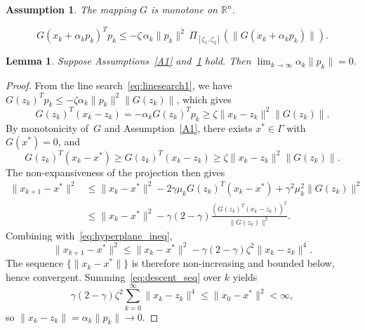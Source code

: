 \documentclass[10pt,a4paper]{amsart}
\newtheorem{assumption}{Assumption}
\newtheorem{lemma}{Lemma}
\newcommand{\PI}[1]{\Pi_{#1}}
\newcommand{\R}{\mathbb{R}}
\newcommand{\norm}[1]{\|#1\|}
\begin{document}
\begin{assumption}\label{A2}
The mapping $G$ is monotone on $\R^n$.
\end{assumption}

    \begin{equation}\label{eq:linesearch1}
      G(x_k + \alpha_k p_k)^T p_k \leq -\zeta\,\alpha_k\norm{p_k}^2\,\PI{[\zeta_1,\zeta_2]}(\norm{G(x_k + \alpha_k p_k)}).
    \end{equation}

\begin{lemma}\label{lem:limGMOP}
Suppose Assumptions~\ref{A1} and~\ref{A2} hold. Then $\lim_{k \to \infty} \alpha_k\norm{p_k} = 0$.
\end{lemma}

\begin{proof}
From the line search~\eqref{eq:linesearch1}, we have $G(z_k)^T p_k \leq -\zeta\alpha_k\norm{p_k}^2\norm{G(z_k)}$, which gives
\begin{equation}\label{eq:hyperplane_ineq}
  G(z_k)^T(x_k - z_k) = -\alpha_k G(z_k)^T p_k \geq \zeta\norm{x_k - z_k}^2\norm{G(z_k)}.
\end{equation}
By monotonicity of~$G$ and Assumption~\ref{A1}, there exists $x^* \in \Gamma$ with $G(x^*) = 0$, and
\begin{equation}\label{eq:mono_ineq}
  G(z_k)^T(x_k - x^*) \geq G(z_k)^T(x_k - z_k) \geq \zeta\norm{x_k - z_k}^2\norm{G(z_k)}.
\end{equation}
The non-expansiveness of the projection then gives
\begin{align*}
  \norm{x_{k+1} - x^*}^2 &\leq \norm{x_k - x^*}^2 - 2\gamma\mu_k G(z_k)^T(x_k - x^*) + \gamma^2\mu_k^2\norm{G(z_k)}^2 \\
  &\leq \norm{x_k - x^*}^2 - \gamma(2-\gamma)\frac{(G(z_k)^T(x_k - z_k))^2}{\norm{G(z_k)}^2}.
\end{align*}
Combining with~\eqref{eq:hyperplane_ineq},
\begin{equation}\label{eq:descent_seq}
  \norm{x_{k+1} - x^*}^2 \leq \norm{x_k - x^*}^2 - \gamma(2-\gamma)\zeta^2\norm{x_k - z_k}^4.
\end{equation}
The sequence $\{\norm{x_k - x^*}\}$ is therefore non-increasing and bounded below, hence convergent. Summing~\eqref{eq:descent_seq} over $k$ yields
\[
  \gamma(2-\gamma)\zeta^2 \sum_{k=0}^{\infty}\norm{x_k - z_k}^4 \leq \norm{x_0 - x^*}^2 < \infty,
\]
so $\norm{x_k - z_k} = \alpha_k\norm{p_k} \to 0$.
\end{proof}
\end{document}
